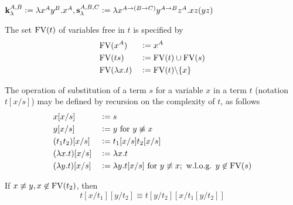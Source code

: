 \documentclass[11pt]{article}
\begin{document}
\begin{examplle}[]
\(\operatorname{\textbf{k}}_\lambda^{A,B}:=\lambda x^Ay^B.x^A,\operatorname{\textbf{s}}_\lambda^{A,B,C}:=\lambda x^{A\to
   (B\to C)}y^{A\to B}z^A.xz(yz)\)
\end{examplle}
\begin{definition}[]
The set \(\text{FV}(t)\) of variables free in \(t\) is specified by
\begin{alignat*}{2}
&\text{FV}(x^A)&&:=x^A\\
&\text{FV}(ts)&&:=\text{FV}(t)\cup\text{FV}(s)\\
&\text{FV}(\lambda x.t)&&:=\text{FV}(t)\backslash\{x\}
\end{alignat*}
\end{definition}


\begin{definition}[Substitution]
The operation of substitution of a term \(s\) for a variable \(x\) in a term \(t\)
(notation \(t[x/s]\)) may be defined by recursion on the complexity of \(t\), as
follows
\begin{alignat*}{2}
&x[x/s]&&:=s\\
&y[x/s]&&:=y\text{ for } y\not\equiv x\\
&(t_1t_2)[x/s]&&:=t_1[x/s]t_2[x/s]\\
&(\lambda x.t)[x/s]&&:=\lambda x.t\\
&(\lambda y.t)[x/s]&&:=\lambda y.t[x/s]\text{ for } y\not\equiv x; \text{
w.l.o.g. } y\not\in\text{FV}(s)
\end{alignat*}
\end{definition}

\begin{lemma}
If \(x\not\equiv y, x\not\in\text{FV}(t_2)\), then
\begin{equation*}
t[x/t_1][y/t_2]\equiv t[y/t_2][x/t_1[y/t_2]]
\end{equation*}
\end{lemma}
\end{document}

